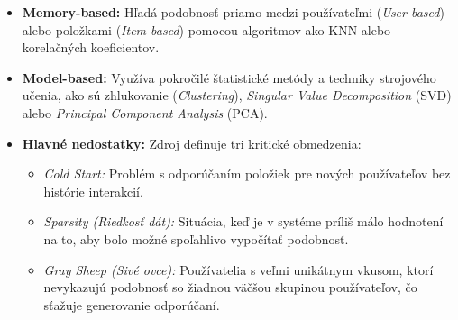 \begin{itemize}
    \item \textbf{Memory-based:} Hľadá podobnosť priamo medzi používateľmi (\textit{User-based}) alebo položkami (\textit{Item-based}) pomocou algoritmov ako KNN alebo korelačných koeficientov.
    \item \textbf{Model-based:} Využíva pokročilé štatistické metódy a techniky strojového učenia, ako sú zhlukovanie (\textit{Clustering}), \textit{Singular Value Decomposition} (SVD) alebo \textit{Principal Component Analysis} (PCA).
    \item \textbf{Hlavné nedostatky:} Zdroj \cite{electronics11010141} definuje tri kritické obmedzenia:
    \begin{itemize}
        \item \textit{Cold Start:} Problém s odporúčaním položiek pre nových používateľov bez histórie interakcií.
        \item \textit{Sparsity (Riedkosť dát):} Situácia, keď je v systéme príliš málo hodnotení na to, aby bolo možné spoľahlivo vypočítať podobnosť.
        \item \textit{Gray Sheep (Sivé ovce):} Používatelia s veľmi unikátnym vkusom, ktorí nevykazujú podobnosť so žiadnou väčšou skupinou používateľov, čo sťažuje generovanie odporúčaní.
    \end{itemize}
\end{itemize}

